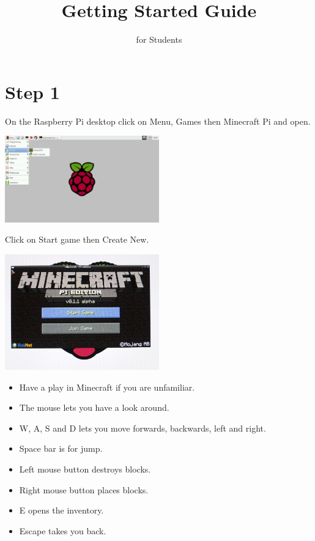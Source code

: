 \documentclass{geocraft-worksheet-multipage}
\begin{document}
\title{Getting Started Guide}
\subtitle{for Students}
\date{}

\maketitle
 
\section*{Step 1}
On the Raspberry Pi desktop click on Menu, Games then Minecraft Pi and
open.\vspace{0.4cm}

\includegraphics[width=0.5\textwidth]{pic1}\vspace{0.4cm}

Click on Start game then Create New.\vspace{0.4cm}

\includegraphics[width=0.5\textwidth]{pic2}\vspace{0.4cm}

\begin{itemize}
\item Have a play in Minecraft if you are unfamiliar.
\item The mouse lets you have a look around.
\item W, A, S and D lets you move forwards, backwards, left and right.
\item Space bar is for jump.
\item Left mouse button destroys blocks.
\item Right mouse button places blocks.
\item E opens the inventory.
\item Escape takes you back.
\end{itemize}
\end{document}
